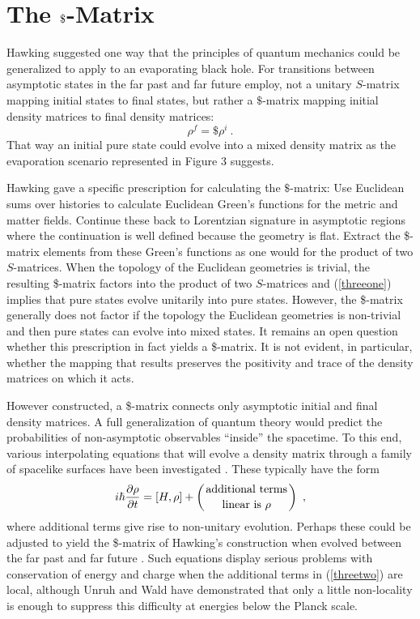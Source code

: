 \section{The ${\bf \$}$-Matrix}
\label{sec:III}

Hawking \cite{Haw82} suggested one way that the principles of quantum
mechanics could be generalized to apply to an evaporating black hole.
For transitions between asymptotic states in the far past and far future
employ, not a unitary $S$-matrix mapping initial states to final states,
but rather a $\$$-matrix mapping initial density matrices to final density
matrices:
\begin{equation}
\rho^f = \$ \rho^i\ .
\label{threeone}
\end{equation}
That way an initial pure state could evolve into a mixed density matrix
as the evaporation scenario represented in Figure 3 suggests.

Hawking gave a specific prescription for calculating the $\$$-matrix: 
Use Euclidean sums over histories to calculate Euclidean
Green's functions for the metric and matter
fields. Continue these back to Lorentzian
signature in asymptotic regions
where the continuation is well defined because
the geometry is flat. Extract the \$-matrix elements from these Green's
functions as one would for the product of two $S$-matrices.  When the
topology of the Euclidean geometries is trivial, the resulting \$-matrix
factors into the product of two $S$-matrices and (\ref{threeone}) implies
that pure states evolve unitarily into pure states.  However, the \$-matrix
generally does not factor if the
topology the Euclidean geometries is non-trivial 
and then pure states can evolve into mixed states.
It remains an open question whether this prescription in fact yields a
\$-matrix.  It is not evident, in particular, whether the mapping that
results preserves the
positivity and trace of the density matrices on which it acts.

However constructed, a \$-matrix connects only asymptotic initial
and final density matrices. A full generalization of quantum theory
would predict the probabilities of non-asymptotic observables ``inside''
the spacetime.  To this end, various interpolating equations that will
evolve a density matrix through a family of spacelike surfaces have been
investigated \cite{BPSsum,UW95}. These typically have the form
\begin{equation}
i\hbar \frac{\partial\rho}{\partial t} = [H,\rho] + \left({\rm additional
\ terms} \atop {\rm linear\ is\ \rho}\right)\ ,
\label{threetwo}
\end{equation}
where additional terms give rise to non-unitary evolution.  Perhaps
these could be adjusted to yield the \$-matrix of Hawking's construction
when evolved between the far past and far future \cite{SWHpc}. 
Such equations display
serious problems with conservation of energy and charge when the
additional terms in (\ref{threetwo}) are local, although Unruh and Wald
\cite{UW95} have demonstrated that only a little non-locality is enough to
suppress this difficulty at energies below the Planck scale.

